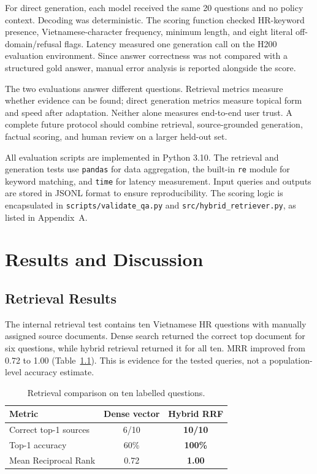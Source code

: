 \documentclass[12pt,a4paper,oneside]{report}
\begin{document}
For direct generation, each model received the same 20 questions and no policy
context. Decoding was deterministic. The scoring function checked HR-keyword
presence, Vietnamese-character frequency, minimum length, and eight literal
off-domain/refusal flags. Latency measured one generation call on the H200
evaluation environment. Since answer correctness was not compared with a
structured gold answer, manual error analysis is reported alongside the score.

The two evaluations answer different questions. Retrieval metrics measure
whether evidence can be found; direct generation metrics measure topical form
and speed after adaptation. Neither alone measures end-to-end user trust. A
complete future protocol should combine retrieval, source-grounded generation,
factual scoring, and human review on a larger held-out set.

All evaluation scripts are implemented in Python 3.10. The retrieval and
generation tests use \texttt{pandas} for data aggregation, the built-in
\texttt{re} module for keyword matching, and \texttt{time} for latency
measurement. Input queries and outputs are stored in JSONL format to ensure
reproducibility. The scoring logic is encapsulated in
\texttt{scripts/validate\_qa.py} and \texttt{src/hybrid\_retriever.py}, as
listed in Appendix~A.

\chapter{Results and Discussion}

\section{Retrieval Results}
The internal retrieval test contains ten Vietnamese HR questions with manually
assigned source documents. Dense search returned the correct top document for
six questions, while hybrid retrieval returned it for all ten. MRR improved
from 0.72 to 1.00 (Table~\ref{tab:retrieval-results}). This is evidence for the
tested queries, not a population-level accuracy estimate.

\begin{table}[H]
\centering
\caption{Retrieval comparison on ten labelled questions.}
\label{tab:retrieval-results}
\begin{tabular}{@{}lcc@{}}
\toprule
\textbf{Metric} & \textbf{Dense vector} & \textbf{Hybrid RRF} \\
\midrule
Correct top-1 sources & 6/10 & \textbf{10/10} \\
Top-1 accuracy & 60\% & \textbf{100\%} \\
Mean Reciprocal Rank & 0.72 & \textbf{1.00} \\
\bottomrule
\end{tabular}
\end{table}
\end{document}
